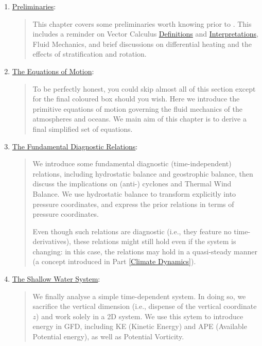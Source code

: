 \begin{enumerate}
    \item \hyperref[Prelim GFD]{Preliminaries}: 
        
        \begin{quote}
            This chapter covers some preliminaries worth knowing prior to . This includes a reminder on Vector Calculus \hyperref[VC box]{Definitions} and \hyperref[VC Interp]{Interpretations}, Fluid Mechanics, and brief discussions on differential heating and the effects of stratification and rotation.
        \end{quote} 

    \item \hyperref[EoM GFD]{The Equations of Motion}: 
    
        \begin{quote}
            To be perfectly honest, you could skip almost all of this section except for the final coloured box should you wish. Here we introduce the primitive equations of motion governing the fluid mechanics of the atmospheres and oceans. We main aim of this chapter is to derive a final simplified set of equations.
        \end{quote}
    
    \item \hyperref[Dia Relations]{The Fundamental Diagnostic Relations}:
        
        \begin{quote}
            We introduce some fundamental diagnostic (time-independent) relations, including hydrostatic balance and geostrophic balance, then discuss the implications on (anti-) cyclones and Thermal Wind Balance. We use hydrostatic balance to transform explicitly into pressure coordinates, and express the prior relations in terms of pressure coordinates.

            Even though such relations are diagnostic (i.e., they feature no time-derivatives), these relations might still hold even if the system is changing: in this case, the relations may hold in a quasi-steady manner (a concept introduced in Part \ref{Climate Dynamics}).
        \end{quote}
    
    \item \hyperref[Shallow Water System]{The Shallow Water System}:
        
        \begin{quote}
            We finally analyse a simple time-dependent system. In doing so, we sacrifice the vertical dimension (i.e., dispense of the vertical coordinate $z$) and work solely in a 2D system. We use this sytem to introduce energy in GFD, including KE (Kinetic Energy) and APE (Available Potential energy), as well as Potential Vorticity. 
            

\end{quote}
\end{enumerate}
